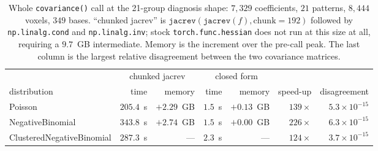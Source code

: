 \begin{table}[htbp]
\centering
\caption{Whole \texttt{covariance()} call at the 21-group diagnosis shape: $7{,}329$
coefficients, $21$ patterns, $8{,}444$ voxels, $349$ bases. ``chunked jacrev'' is
$\texttt{jacrev}(\texttt{jacrev}(f), \text{chunk}=192)$ followed by \texttt{np.linalg.cond}
and \texttt{np.linalg.inv}; stock \texttt{torch.func.hessian} does not run at this size at all,
requiring a $9.7$~GB intermediate. Memory is the increment over the pre-call peak. The last
column is the largest relative disagreement between the two covariance matrices.}
\label{tab:scale}
\begin{tabular}{lrrrrrr}
\toprule
& \multicolumn{2}{c}{chunked jacrev} & \multicolumn{2}{c}{closed form} & & \\
\cmidrule(lr){2-3}\cmidrule(lr){4-5}
distribution & time & memory & time & memory & speed-up & disagreement \\
\midrule
Poisson                    & $205.4$~s & $+2.29$~GB & $1.5$~s & $+0.13$~GB & $139\times$ & $5.3\times10^{-15}$ \\
NegativeBinomial           & $343.8$~s & $+2.74$~GB & $1.5$~s & $+0.00$~GB & $226\times$ & $6.3\times10^{-15}$ \\
ClusteredNegativeBinomial  & $287.3$~s & ---        & $2.3$~s & ---        & $124\times$ & $3.7\times10^{-15}$ \\
\bottomrule
\end{tabular}
\end{table}
